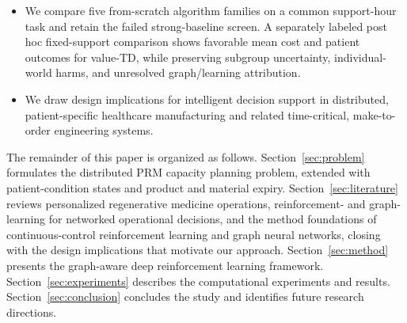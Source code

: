 \documentclass[preprint,review,12pt]{elsarticle}
\begin{document}
\begin{itemize}
    \item We compare five from-scratch algorithm families on a common support-hour task and retain the failed strong-baseline screen. A separately labeled post hoc fixed-support comparison shows favorable mean cost and patient outcomes for value-TD, while preserving subgroup uncertainty, individual-world harms, and unresolved graph/learning attribution.
    \item We draw design implications for intelligent decision support in distributed, patient-specific healthcare manufacturing and related time-critical, make-to-order engineering systems.
\end{itemize}

The remainder of this paper is organized as follows. Section~\ref{sec:problem} formulates the distributed PRM capacity planning problem, extended with patient-condition states and product and material expiry. Section~\ref{sec:literature} reviews personalized regenerative medicine operations, reinforcement- and graph-learning for networked operational decisions, and the method foundations of continuous-control reinforcement learning and graph neural networks, closing with the design implications that motivate our approach. Section~\ref{sec:method} presents the graph-aware deep reinforcement learning framework. Section~\ref{sec:experiments} describes the computational experiments and results. Section~\ref{sec:conclusion} concludes the study and identifies future research directions.
\end{document}
